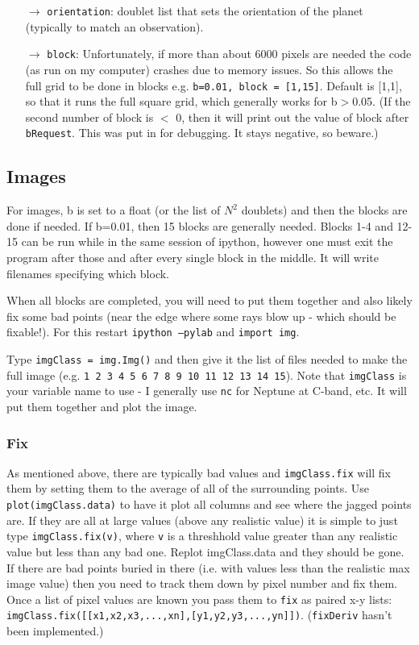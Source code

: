 \documentclass[11pt]{article}
\begin{document}
\begin{itemize}
\item[$\rightarrow$]  \texttt{orientation}:  doublet list that sets the orientation of the planet (typically to match an observation).
\item[$\rightarrow$]  \texttt{block}:  Unfortunately, if more than about 6000 pixels are needed the code (as run on my computer) crashes due to memory issues.  So this allows the full grid to be done in blocks e.g. \texttt{b=0.01, block = [1,15]}.  Default is [1,1], so that it runs the full square grid, which generally works for b$>$0.05.  (If the second number of block is $<$ 0, then it
will print out the value of block after \texttt{bRequest}.  This was put in for debugging.  It stays negative, so beware.)
\end{itemize}

\subsection{Images}
For images, b is set to a float (or the list of $N^2$ doublets) and then the blocks are done if needed.  If b=0.01, then 15 blocks are generally needed.  Blocks 1-4 and 12-15 can be run while in the same session of ipython, however one must exit the program after those and after every single block in the middle.  It will write filenames specifying which block.

When all blocks are completed, you will need to put them together and also likely fix some bad points (near the edge where some rays blow up - which should be fixable!).  For this restart \texttt{ipython --pylab} and \texttt{import img}.

Type \texttt{imgClass = img.Img()} and then give it the list of files needed to make the full image (e.g. \texttt{1 2 3 4 5 6 7 8 9 10 11 12 13 14 15}). Note that \texttt{imgClass} is your variable name to use - I generally use \texttt{nc} for Neptune at C-band, etc.  It will put them together and plot the image.    

\subsubsection{Fix}
As mentioned above, there are typically bad values and \texttt{imgClass.fix} will fix them by setting them to the average of all of the surrounding points.
Use \texttt{plot(imgClass.data)} to have it plot all columns and see where the jagged points are.  If they are all at large values (above any realistic value) it is simple to just type \texttt{imgClass.fix(v)}, where \texttt{v} is a threshhold value greater than any realistic value but less than any bad one.  Replot imgClass.data and they should be gone.  If there are bad points buried in there (i.e. with values less than the realistic max image value) then you need to track them down by pixel number and fix them.  Once a list of pixel values are known you pass them to \texttt{fix} as paired x-y lists:  \texttt{imgClass.fix([[x1,x2,x3,...,xn],[y1,y2,y3,...,yn]])}.  
(\texttt{fixDeriv} hasn't been implemented.)
\end{document}
